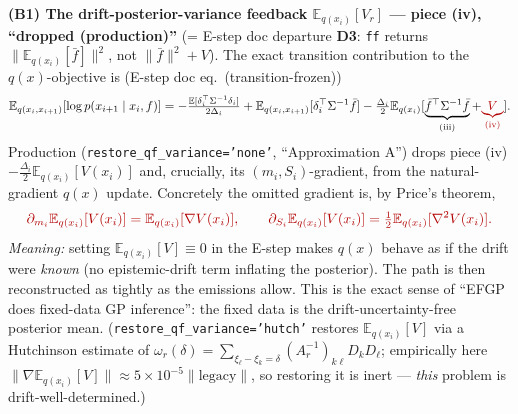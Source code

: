 \documentclass[11pt]{article}
\newcommand{\Eqx}{\mathbb{E}_{q(x_i)}}
\newcommand{\Eqxx}{\mathbb{E}_{q(x_i,x_{i+1})}}
\newcommand{\E}{\mathbb{E}}
\newcommand{\given}{\mid}
\newcommand{\code}[1]{\texttt{#1}}
\newcommand{\dropped}[1]{\textcolor{red!70!black}{#1}}
\begin{document}
\medskip
\noindent\textbf{(B1) The drift-posterior-variance feedback $\Eqx[V_r]$ --- piece (iv), ``dropped (production)''}
(= E-step doc departure \textbf{D3}: \code{ff} returns
$\|\Eqx[\bar f]\|^2$, not $\|\bar f\|^2{+}V$).
The exact transition contribution to the $q(x)$-objective is (E-step doc
eq.~(transition-frozen))
\begin{equation}
\Eqxx[\log p(x_{i+1}\given x_i,f)]
=-\tfrac{\E[\delta_i^\top\Sigma^{-1}\delta_i]}{2\Delta_i}
+\Eqxx[\delta_i^\top\Sigma^{-1}\bar f]
-\tfrac{\Delta_i}{2}\Eqx[\underbrace{\bar f^\top\Sigma^{-1}\bar f}_{\text{(iii)}}+\dropped{\underbrace{V}_{\text{(iv)}}}].
\end{equation}
Production (\texttt{restore\_qf\_variance='none'}, ``Approximation A'') \dropped{drops
piece (iv)} $-\tfrac{\Delta_i}{2}\Eqx[V(x_i)]$ and, crucially, its
$(m_i,S_i)$-gradient, from the natural-gradient $q(x)$ update. Concretely the
omitted gradient is, by Price's theorem,
\begin{equation}
\dropped{\;\partial_{m_i}\Eqx[V(x_i)]=\Eqx[\nabla V(x_i)],\qquad
\partial_{S_i}\Eqx[V(x_i)]=\tfrac12\Eqx[\nabla^2 V(x_i)].\;}
\end{equation}
\emph{Meaning:} setting $\Eqx[V]\equiv0$ in the E-step makes $q(x)$ behave as if the
drift were \emph{known} (no epistemic-drift term inflating the posterior). The path is
then reconstructed as tightly as the emissions allow. This is the exact sense of
``EFGP does fixed-data GP inference'': the fixed data is the drift-uncertainty-free
posterior mean. (\texttt{restore\_qf\_variance='hutch'} restores $\Eqx[V]$ via a
Hutchinson estimate of $\omega_r(\delta)=\sum_{\xi_\ell-\xi_k=\delta}(A_r^{-1})_{k\ell}
D_kD_\ell$; empirically here $\|\nabla\Eqx[V]\|\approx5\times10^{-5}\|\text{legacy}\|$,
so restoring it is inert --- \emph{this} problem is drift-well-determined.)
\end{document}
